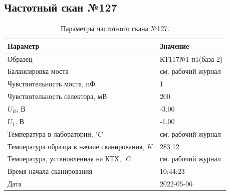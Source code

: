 \subsection{Частотный скан №127}
\begin{table}[!ht]
    \centering
    \caption{Параметры частотного скана №127.}
    \begin{tabular}{|l|l|}
        \hline
        Параметр                                       & Значение                  \\ \hline
        Образец                                        & КТ117№1 п1(база 2)        \\ \hline
        Балансировка моста                             & см. рабочий журнал        \\ \hline
        Чувствительность моста, пФ                     & 1                         \\ \hline
        Чувствительность селектора, мВ                 & 200                       \\ \hline
        $U_R$, В                                       & -3.00                     \\ \hline
        $U_1$, В                                       & -1.00                     \\ \hline
        Температура в лаборатории, $^\circ C$          & см. рабочий журнал        \\ \hline
        Температура образца в начале сканирования, $K$ & 283.12                    \\ \hline
        Температура, установленная на КТХ, $^\circ C$  & см. рабочий журнал        \\ \hline
        Время начала сканирования                      & 10:44:23                  \\ \hline
        Дата                                           & 2022-05-06                \\ \hline
    \end{tabular}
    \label{table:frequency_scan_127}
\end{table}

